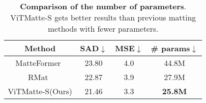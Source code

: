 \documentclass[10pt,twocolumn,letterpaper]{article}
\newcommand{\thename}{ViTMatte}
\begin{document}
\begin{table}[tbp]
\renewcommand{\arraystretch}{1.1}
\centering
{}
\caption{\textbf{Quantitative results on Distinctions-646}.}
\label{distinctions-646}
\end{table}

\begin{table}[tbp]
\renewcommand{\arraystretch}{1.1}
\centering
\begin{tabular}{c|ccc}
\toprule
Method          & SAD$\downarrow$ &MSE$\downarrow$ & \# params$\downarrow$ \\
\midrule
MatteFormer~\cite{matteformer}               & 23.80          & 4.0          & 44.8M           \\
RMat~\cite{rmat}                      & 22.87          & 3.9          & 27.9M           \\
\midrule
ViTMatte-S(Ours) & 21.46 & 3.3 & \textbf{25.8M}  \\
\bottomrule
\end{tabular}
\caption{\textbf{Comparison of the number of parameters}. \thename{}-S gets better results than previous matting methods with fewer parameters.}
\label{pp-trade-off}
\end{table}
\end{document}
